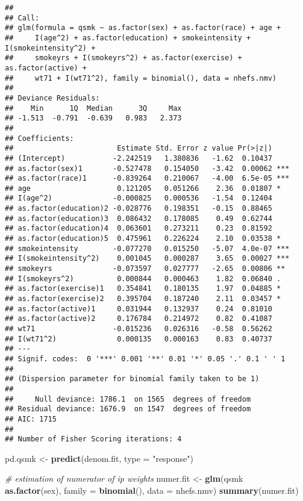 \documentclass[10pt,]{book}
\newenvironment{Shaded}{\begin{snugshade}}{\end{snugshade}}
\newcommand{\CommentTok}[1]{\textcolor[rgb]{0.56,0.35,0.01}{\textit{#1}}}
\newcommand{\DataTypeTok}[1]{\textcolor[rgb]{0.13,0.29,0.53}{#1}}
\newcommand{\KeywordTok}[1]{\textcolor[rgb]{0.13,0.29,0.53}{\textbf{#1}}}
\newcommand{\NormalTok}[1]{#1}
\newcommand{\OperatorTok}[1]{\textcolor[rgb]{0.81,0.36,0.00}{\textbf{#1}}}
\newcommand{\StringTok}[1]{\textcolor[rgb]{0.31,0.60,0.02}{#1}}
\begin{document}
\begin{verbatim}
## 
## Call:
## glm(formula = qsmk ~ as.factor(sex) + as.factor(race) + age + 
##     I(age^2) + as.factor(education) + smokeintensity + I(smokeintensity^2) + 
##     smokeyrs + I(smokeyrs^2) + as.factor(exercise) + as.factor(active) + 
##     wt71 + I(wt71^2), family = binomial(), data = nhefs.nmv)
## 
## Deviance Residuals: 
##    Min      1Q  Median      3Q     Max  
## -1.513  -0.791  -0.639   0.983   2.373  
## 
## Coefficients:
##                        Estimate Std. Error z value Pr(>|z|)    
## (Intercept)           -2.242519   1.380836   -1.62  0.10437    
## as.factor(sex)1       -0.527478   0.154050   -3.42  0.00062 ***
## as.factor(race)1      -0.839264   0.210067   -4.00  6.5e-05 ***
## age                    0.121205   0.051266    2.36  0.01807 *  
## I(age^2)              -0.000825   0.000536   -1.54  0.12404    
## as.factor(education)2 -0.028776   0.198351   -0.15  0.88465    
## as.factor(education)3  0.086432   0.178085    0.49  0.62744    
## as.factor(education)4  0.063601   0.273211    0.23  0.81592    
## as.factor(education)5  0.475961   0.226224    2.10  0.03538 *  
## smokeintensity        -0.077270   0.015250   -5.07  4.0e-07 ***
## I(smokeintensity^2)    0.001045   0.000287    3.65  0.00027 ***
## smokeyrs              -0.073597   0.027777   -2.65  0.00806 ** 
## I(smokeyrs^2)          0.000844   0.000463    1.82  0.06840 .  
## as.factor(exercise)1   0.354841   0.180135    1.97  0.04885 *  
## as.factor(exercise)2   0.395704   0.187240    2.11  0.03457 *  
## as.factor(active)1     0.031944   0.132937    0.24  0.81010    
## as.factor(active)2     0.176784   0.214972    0.82  0.41087    
## wt71                  -0.015236   0.026316   -0.58  0.56262    
## I(wt71^2)              0.000135   0.000163    0.83  0.40737    
## ---
## Signif. codes:  0 '***' 0.001 '**' 0.01 '*' 0.05 '.' 0.1 ' ' 1
## 
## (Dispersion parameter for binomial family taken to be 1)
## 
##     Null deviance: 1786.1  on 1565  degrees of freedom
## Residual deviance: 1676.9  on 1547  degrees of freedom
## AIC: 1715
## 
## Number of Fisher Scoring iterations: 4
\end{verbatim}

\begin{Shaded}
\begin{Highlighting}[]
\NormalTok{pd.qsmk <-}\StringTok{ }\KeywordTok{predict}\NormalTok{(denom.fit, }\DataTypeTok{type =} \StringTok{"response"}\NormalTok{)}

\CommentTok{# estimation of numerator of ip weights}
\NormalTok{numer.fit <-}
\StringTok{  }\KeywordTok{glm}\NormalTok{(qsmk }\OperatorTok{~}\StringTok{ }\KeywordTok{as.factor}\NormalTok{(sex), }\DataTypeTok{family =} \KeywordTok{binomial}\NormalTok{(), }\DataTypeTok{data =}\NormalTok{ nhefs.nmv)}
\KeywordTok{summary}\NormalTok{(numer.fit)}
\end{Highlighting}
\end{Shaded}
\end{document}
